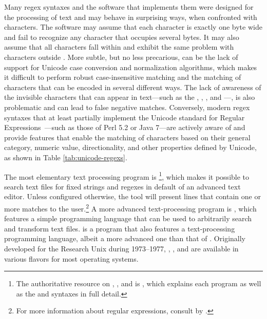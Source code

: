 Many regex syntaxes and the software that implements them were designed for the
processing of  text and may behave in surprising ways, when
confronted with  characters. The software may assume that each
character is exactly one byte wide and fail to recognize any character that
occupies several bytes. It may also assume that all  characters
fall within  and exhibit the same problem with characters outside
. More subtle, but no less precarious, can be the lack of support
for Unicode case conversion and normalization algorithms, which makes it
difficult to perform robust case-insensitive matching and the matching of
characters that can be encoded in several different ways. The lack of awareness
of the invisible characters that can appear in  text---such as the
, , , and ---, is also problematic
and can lead to false negative matches. Conversely, modern regex syntaxes that
at least partially implement the Unicode standard for Regular
Expressions~\cite{unicode13}---such as those of Perl 5.2 or Java 7---are
actively aware of  and provide features that enable the matching of
characters based on their general category, numeric value, directionality, and
other properties defined by Unicode, as shown in Table \ref{tab:unicode-regexs}.

\begin{table}[!tb]
  
  \caption{The elements of the Unicode regex syntax implemented by Perl 5.2
    and Java 7. The list of properties is not exhaustive.}
  \label{tab:unicode-regexs}
\end{table}

The most elementary text processing  program is %
\footnote{
  The authoritative resource on , , and 
  is , which explains each program as well as the
   and  syntaxes in full detail.
}, which makes it possible to search text files for fixed strings and regexes in
default of an advanced text editor. Unless configured otherwise, the tool will
present lines that contain one or more matches to the user.\footnote{%
  For more information about regular expressions, consult 
  by .}
A more advanced text-processing  program is , which
features a simple programming language that can be used to arbitrarily search
and transform text files.  is a  program that also
features a text-processing programming language, albeit a more advanced one
than that of . Originally developed for the Research Unix during
1973--1977, , , and  are available in
various flavors for most operating systems.

